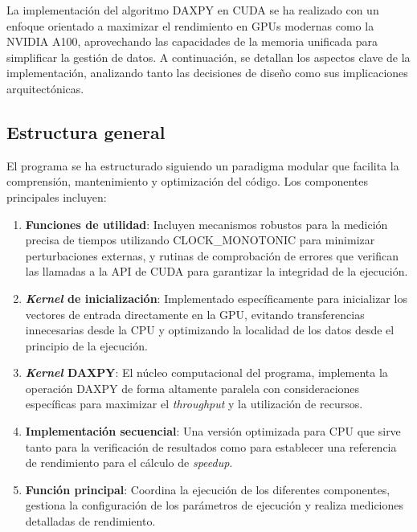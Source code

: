     La implementación del algoritmo DAXPY en CUDA se ha realizado con un enfoque orientado a maximizar el rendimiento en GPUs modernas como la NVIDIA A100, aprovechando las capacidades de la memoria unificada para simplificar la gestión de datos. A continuación, se detallan los aspectos clave de la implementación, analizando tanto las decisiones de diseño como sus implicaciones arquitectónicas.
    
    \subsection{Estructura general}

        El programa se ha estructurado siguiendo un paradigma modular que facilita la comprensión, mantenimiento y optimización del código. Los componentes principales incluyen:

        \begin{enumerate}
        
            \item \textbf{Funciones de utilidad}: Incluyen mecanismos robustos para la medición precisa de tiempos utilizando CLOCK\_MONOTONIC para minimizar perturbaciones externas, y rutinas de comprobación de errores que verifican las llamadas a la API de CUDA para garantizar la integridad de la ejecución.
            
            \item \textbf{\textit{Kernel} de inicialización}: Implementado específicamente para inicializar los vectores de entrada directamente en la GPU, evitando transferencias innecesarias desde la CPU y optimizando la localidad de los datos desde el principio de la ejecución.
            
            \item \textbf{\textit{Kernel} DAXPY}: El núcleo computacional del programa, implementa la operación DAXPY de forma altamente paralela con consideraciones específicas para maximizar el \textit{throughput} y la utilización de recursos.
            
            \item \textbf{Implementación secuencial}: Una versión optimizada para CPU que sirve tanto para la verificación de resultados como para establecer una referencia de rendimiento para el cálculo de \textit{speedup}.
            
            \item \textbf{Función principal}: Coordina la ejecución de los diferentes componentes, gestiona la configuración de los parámetros de ejecución y realiza mediciones detalladas de rendimiento.
            
        \end{enumerate}
        
